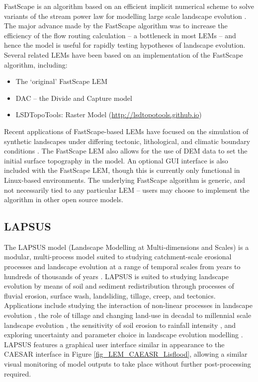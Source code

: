 FastScape is an algorithm based on an efficient implicit numerical scheme to solve variants of the stream power law for modelling large scale landscape evolution \citep{Braun2013}. The major advance made by the FastScape algorithm was to increase the efficiency of the flow routing calculation – a bottleneck in most LEMs -- and hence the model is useful for rapidly testing hypotheses of landscape evolution. Several related LEMs have been based on an implementation of the FastScape algorithm, including:

\begin{itemize}
\item The `original' FastScape LEM \citep{Braun2013}
\item DAC -- the Divide and Capture model \citep{Castelltort2012,Goren2014}
\item LSDTopoTools: Raster Model (\url{http://lsdtopotools.github.io})
\end{itemize}
Recent applications of FastScape-based LEMs have focused on the simulation of synthetic landscapes under differing tectonic, lithological, and climatic boundary conditions \citep{Braun2013,Braun2014,Castelltort2012,Yang2015}. The FastScape LEM also allows for the use of DEM data to set the initial surface topography in the model. An optional GUI interface is also included with the FastScape LEM, though this is currently only functional in Linux-based environments. The underlying FastScape algorithm is generic, and not necessarily tied to any particular LEM – users may choose to implement the algorithm in other open source models.

\subsection{LAPSUS}
The LAPSUS model (Landscape Modelling at Multi-dimensions and Scales) is a modular, multi-process model suited to studying catchment-scale erosional processes and landscape evolution at a range of temporal scales from years to hundreds of thousands of years  \citep{schoorl2000three,van2015lapsus}. LAPSUS is suited to studying landscape evolution by means of soil and sediment redistribution through processes of fluvial erosion, surface wash, landsliding, tillage, creep, and tectonics. Applications include studying the interaction of non-linear processes in landscape evolution \citep{Temme2009,Schoorl2014}, the role of tillage and changing land-use in decadal to millennial scale landscape evolution \citep{Schoorl2001,Baartman2012b}, the sensitivity of soil erosion to rainfall intensity \citep{Baartman2012a}, and exploring uncertainty and parameter choice in landscape evolution modelling \citep{Temme2011}. LAPSUS features a graphical user interface similar in appearance to the CAESAR interface in Figure \ref{fig_LEM_CAEASR_Lisflood}, allowing a similar visual monitoring of model outputs to take place without further post-processing required.  

